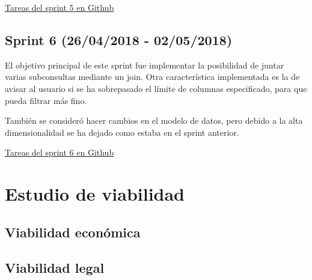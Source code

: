 \href{https://github.com/IvanArjona/TFG-Datos-publicos/milestone/6?closed=1}{Tareas del sprint 5 en Github}

\subsection{Sprint 6 (26/04/2018 - 02/05/2018)}

El objetivo principal de este sprint fue implementar la posibilidad de juntar varias subconsultas mediante un join. Otra característica implementada es la de avisar al usuario si se ha sobrepasado el límite de columnas especificado, para que pueda filtrar más fino.

También se consideró hacer cambios en el modelo de datos, pero debido a la alta dimensionalidad se ha dejado como estaba en el sprint anterior.


\href{https://github.com/IvanArjona/TFG-Datos-publicos/milestone/7?closed=1}{Tareas del sprint 6 en Github}

\section{Estudio de viabilidad}

\subsection{Viabilidad económica}

\subsection{Viabilidad legal}


